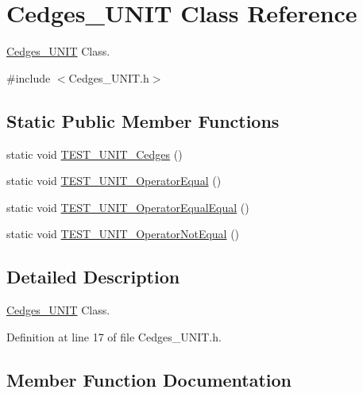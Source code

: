 \hypertarget{class_cedges___u_n_i_t}{}\section{Cedges\+\_\+\+U\+N\+I\+T Class Reference}
\label{class_cedges___u_n_i_t}


\hyperlink{class_cedges___u_n_i_t}{Cedges\+\_\+\+U\+N\+I\+T} Class.  




{\ttfamily \#include $<$Cedges\+\_\+\+U\+N\+I\+T.\+h$>$}

\subsection*{Static Public Member Functions}
\begin{DoxyCompactItemize}
\item 
static void \hyperlink{class_cedges___u_n_i_t_ae982835298ffa32fcba7b0d236d80833}{T\+E\+S\+T\+\_\+\+U\+N\+I\+T\+\_\+\+Cedges} ()
\item 
static void \hyperlink{class_cedges___u_n_i_t_a167aad129f34af8a3c856ebbb687fab9}{T\+E\+S\+T\+\_\+\+U\+N\+I\+T\+\_\+\+Operator\+Equal} ()
\item 
static void \hyperlink{class_cedges___u_n_i_t_ac91eba131a9ebd19720f7eb0fdb4b3e0}{T\+E\+S\+T\+\_\+\+U\+N\+I\+T\+\_\+\+Operator\+Equal\+Equal} ()
\item 
static void \hyperlink{class_cedges___u_n_i_t_a1842ab1f66d95b06a292a7fdc54fbee2}{T\+E\+S\+T\+\_\+\+U\+N\+I\+T\+\_\+\+Operator\+Not\+Equal} ()
\end{DoxyCompactItemize}


\subsection{Detailed Description}
\hyperlink{class_cedges___u_n_i_t}{Cedges\+\_\+\+U\+N\+I\+T} Class. 

Definition at line 17 of file Cedges\+\_\+\+U\+N\+I\+T.\+h.



\subsection{Member Function Documentation}
\hypertarget{class_cedges___u_n_i_t_ae982835298ffa32fcba7b0d236d80833}{}
